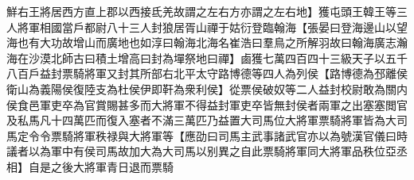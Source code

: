 鮮右王將居西方直上郡以西接氐羌故謂之左右方亦謂之左右地】獲屯頭王韓王等三人將軍相國當戶都尉八十三人封狼居胥山禪于姑衍登臨翰海【張晏曰登海邊山以望海也有大功故增山而廣地也如淳曰翰海北海名崔浩曰羣鳥之所解羽故曰翰海廣志瀚海在沙漠北師古曰積土增高曰封為墠祭地曰禪】鹵獲七萬四百四十三級天子以五千八百戶益封票騎將軍又封其所部右北平太守路博德等四人為列侯【路博德為邳離侯衛山為義陽侯復陸支為杜侯伊即靬為衆利侯】從票侯破奴等二人益封校尉敢為關内侯食邑軍吏卒為官賞賜甚多而大將軍不得益封軍吏卒皆無封侯者兩軍之出塞塞閲官及私馬凡十四萬匹而復入塞者不滿三萬匹乃益置大司馬位大將軍票騎將軍皆為大司馬定令令票騎將軍秩禄與大將軍等【應劭曰司馬主武事諸武官亦以為號漢官儀曰時議者以為軍中有侯司馬故加大為大司馬以别異之自此票騎將軍同大將軍品秩位亞丞相】自是之後大將軍青日退而票騎